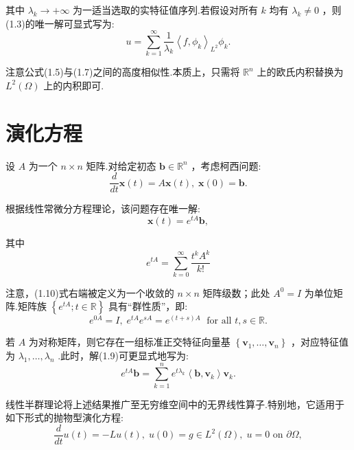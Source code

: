 其中 ${\lambda }_{k} \rightarrow   + \infty$ 为一适当选取的实特征值序列.若假设对所有 $k$ 均有 ${\lambda }_{k} \neq  0$ ，则(1.3)的唯一解可显式写为:
\begin{equation}\tag{1.7}
u = \mathop{\sum }\limits_{{k = 1}}^{\infty }\frac{1}{{\lambda }_{k}}{\left\langle  f,{\phi }_{k}\right\rangle  }_{L^2}{\phi }_{k}.
\end{equation}

注意公式(1.5)与(1.7)之间的高度相似性.本质上，只需将 ${\mathbb{R}}^{n}$ 上的欧氏内积替换为 $L^2\left( \Omega \right)$ 上的内积即可.

\section{演化方程}

设 $A$ 为一个 $n \times  n$ 矩阵.对给定初态 $\bm{b} \in  {\mathbb{R}}^{n}$ ，考虑柯西问题:
\begin{equation}\tag{1.8}
\frac{d}{dt}\bm{x}\left( t\right)  = A\bm{x}\left( t\right) ,\;\bm{x}\left( 0\right)  = \bm{b}.
\end{equation}

根据线性常微分方程理论，该问题存在唯一解:
\begin{equation}\tag{1.9}
\bm{x}\left( t\right)  = {e}^{tA}\bm{b},
\end{equation}

其中
\begin{equation}\tag{1.10}
{e}^{tA} = \mathop{\sum }\limits_{{k = 0}}^{\infty }\frac{{t}^{k}{A}^{k}}{k!}
\end{equation}

注意，(1.10)式右端被定义为一个收敛的 $n \times  n$ 矩阵级数；此处 ${A}^{0} = I$ 为单位矩阵.矩阵族 $\left\{  {{e}^{tA};t \in  \mathbb{R}}\right\}$ 具有“群性质”，即:
\[
{e}^{0A} = I,\;{e}^{tA}{e}^{sA} = {e}^{\left( {t + s}\right) A}\;\text{ for all }t,s \in  \mathbb{R}.
\]

若 $A$ 为对称矩阵，则它存在一组标准正交特征向量基 $\left\{  {{\bm{v}}_{1},\ldots ,{\bm{v}}_{n}}\right\}$ ，对应特征值为 ${\lambda }_{1},\ldots ,{\lambda }_{n}$ .此时，解(1.9)可更显式地写为:
\[
{e}^{tA}\bm{b} = \mathop{\sum }\limits_{{k = 1}}^{n}{e}^{t{\lambda }_{k}}\left\langle  {\bm{b},{\bm{v}}_{k}}\right\rangle  {\bm{v}}_{k}.
\]

线性半群理论将上述结果推广至无穷维空间中的无界线性算子.特别地，它适用于如下形式的抛物型演化方程:
\begin{equation}\tag{1.11}
\frac{d}{dt}u\left( t\right)  =  - {Lu}\left( t\right) ,\;u\left( 0\right)  = g \in  L^2\left( \Omega \right) ,\;u = 0\text{ on }\partial \Omega ,
\end{equation}

